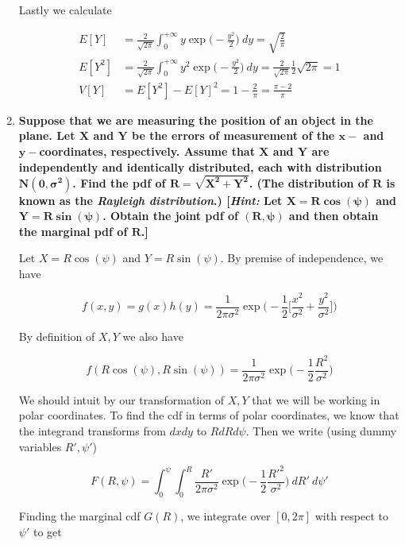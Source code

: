 \documentclass[10pt, oneside]{article}   	%
\theoremstyle{definition}
\begin{document}
\begin{enumerate}[label=9.\arabic*]
Lastly we calculate

\begin{align*}
E[Y] &= \frac{2}{\sqrt{2 \pi}} \int^{+\infty}_0 y \exp \bigg( -\frac{y^2}{2} \bigg) \ dy = \boxed{\sqrt{\frac{2}{\pi}}} \\
E[Y^2] &= \frac{2}{\sqrt{2 \pi}} \int^{+\infty}_0 y^2 \exp \bigg( -\frac{y^2}{2} \bigg) \ dy = \frac{2}{\sqrt{2 \pi}} \frac{1}{2} \sqrt{2 \pi} = 1 \\
V[Y] &= E[Y^2] - E[Y]^2 = 1 - \frac{2}{\pi} = \boxed{\frac{\pi - 2}{\pi}}
\end{align*}

\item  \begin{tcolorbox}[
  colback=Cerulean!5!white,
  colframe=Cerulean!75!black]
\textbf{Suppose that we are measuring the position of an object in the plane. Let $\bm{X}$ and $\bm{Y}$ be the errors of measurement of the $\bm{x-}$ and $\bm{y-}$coordinates, respectively. Assume that $\bm{X}$ and $\bm{Y}$ are independently and identically distributed, each with distribution $\bm{N(0, \sigma^2)}$. Find the pdf of $\bm{R = \sqrt{X^2 + Y^2}}$. (The distribution of $\bm{R}$ is known as the \textit{Rayleigh distribution}.) [\textit{Hint:} Let $\bm{X = R\cos (\psi)}$ and $\bm{Y = R \sin (\psi)}$. Obtain the joint pdf of $\bm{(R, \psi)}$ and then obtain the marginal pdf of $\bm{R}$.]}
\end{tcolorbox}

Let $X = R \cos (\psi)$ and $Y = R \sin (\psi)$. By premise of independence, we have

\[ f(x,y) = g(x) h(y) = \frac{1}{2 \pi \sigma^2} \exp \bigg( -\frac{1}{2} \bigg[ \frac{x^2}{\sigma^2} + \frac{y^2}{\sigma^2} \bigg] \bigg) \]

By definition of $X, Y$ we also have

\[ f(R \cos (\psi), R \sin (\psi)) = \frac{1}{2 \pi \sigma^2} \exp \bigg( -\frac{1}{2} \frac{R^2}{\sigma^2} \bigg) \]

We should intuit by our transformation of $X, Y$ that we will be working in polar coordinates. To find the cdf in terms of polar coordinates, we know that the integrand transforms from $dx  dy$ to $R dR d \psi$. Then we write (using dummy variables $R', \psi'$)

\[ F(R, \psi) = \int^\psi_0 \int^R_0 \frac{R'}{2 \pi \sigma^2} \exp \bigg( -\frac{1}{2} \frac{R'^2}{\sigma^2} \bigg) \ dR' \ d \psi'  \]

Finding the marginal cdf $G(R)$, we integrate over $[0, 2 \pi]$ with respect to $\psi'$ to get


\end{enumerate}
\end{document}

